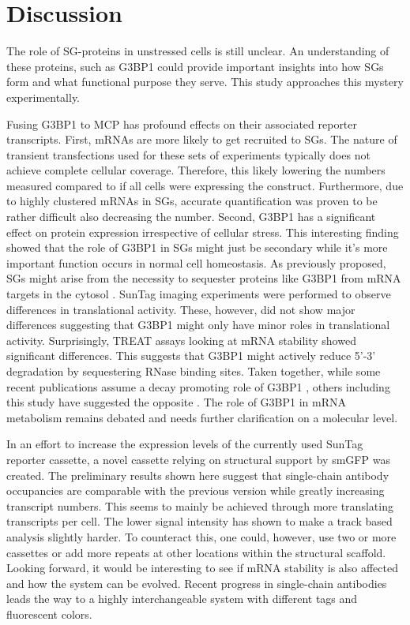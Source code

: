 \chapter{Discussion}


The role of SG-proteins in unstressed cells is still unclear.
An understanding of these proteins, such as G3BP1 could provide important insights into how SGs form and what functional purpose they serve.
This study approaches this mystery experimentally.

Fusing G3BP1 to MCP has profound effects on their associated reporter transcripts.
First, mRNAs are more likely to get recruited to SGs.
The nature of transient transfections used for these sets of experiments typically does not achieve complete cellular coverage.
Therefore, this likely lowering the numbers measured compared to if all cells were expressing the construct.
Furthermore, due to highly clustered mRNAs in SGs, accurate quantification was proven to be rather difficult also decreasing the number.
Second, G3BP1 has a significant effect on protein expression irrespective of cellular stress.
This interesting finding showed that the role of G3BP1 in SGs might just be secondary while it's more important function occurs in normal cell homeostasis.
As previously proposed, SGs might arise from the necessity to sequester proteins like G3BP1 from mRNA targets in the cytosol \cite{fischer_structure-mediated_2020}.
SunTag imaging experiments were performed to observe differences in translational activity.
These, however, did not show major differences suggesting that G3BP1 might only have minor roles in translational activity.
Surprisingly, TREAT assays looking at mRNA stability showed significant differences.
This suggests that G3BP1 might actively reduce 5'-3' degradation by sequestering RNase binding sites.
Taken together, while some recent publications assume a decay promoting role of G3BP1 \cite{fischer_structure-mediated_2020, tourriere_rasgap-associated_2001}, others including this study have suggested the opposite \cite{aulas_g3bp1_2015, bley_stress_2015, laver_rna-binding_2020}.
The role of G3BP1 in mRNA metabolism remains debated and needs further clarification on a molecular level.

In an effort to increase the expression levels of the currently used SunTag reporter cassette, a novel cassette relying on structural support by smGFP was created.
The preliminary results shown here suggest that single-chain antibody occupancies are comparable with the previous version while greatly increasing transcript numbers.
This seems to mainly be achieved through more translating transcripts per cell.
The lower signal intensity has shown to make a track based analysis slightly harder.
To counteract this, one could, however, use two or more cassettes or add more repeats at other locations within the structural scaffold.
Looking forward, it would be interesting to see if mRNA stability is also affected and how the system can be evolved.
Recent progress in single-chain antibodies leads the way to a highly interchangeable system with different tags and fluorescent colors.
